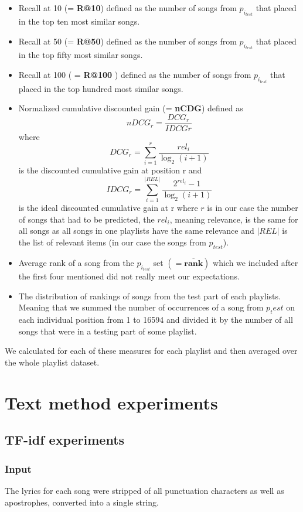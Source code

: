 \begin{itemize}
    \item Recall at 10 (= \textbf{R@10}) defined as the number of songs from $p_{i_{test}} $ that placed in the top ten most similar songs.
    \item Recall at 50 (= \textbf{R@50}) defined as the number of songs from $p_{i_{test}} $ that placed in the top fifty most similar songs.
    \item Recall at 100 ( = \textbf{R@100} ) defined as the number of songs from $p_{i_{test}} $ that placed in the top hundred most similar songs.
    \item Normalized cumulative discounted gain (= \textbf{nCDG}) defined as 
    $${nDCG_{r}} = \frac{DCG_{r}}{IDCG{r}} $$
    where 
    $${DCG_{r}} =\sum_{i=1}^{r}{\frac {rel_{i}}{\log _{2}(i+1)}} $$ 
    is the discounted cumulative gain at position r and 
    $$ {IDCG_{r}} =\sum _{i=1}^{|REL|}{\frac {2^{rel_{i}}-1}{\log _{2}(i+1)}} $$
    is the ideal discounted cumulative gain at r
    where $r$ is in our case the number of songs that had to be predicted, the $rel_i$, meaning relevance, is the same for all songs as all songs in one playlists have the same relevance and $|REL|$ is the list of relevant items (in our case the songs from $p_{test}$).
    \item Average rank of a song from the $p_{i_{test}}$ set $ \boldsymbol{ (= \overline{rank})} $ which we included after the first four mentioned did not really meet our expectations.
    \item The distribution of rankings of songs from the test part of each playlists. Meaning that we summed the number of occurrences of a song from $p_test$ on each individual position from 1 to 16594 and divided it by the number of all songs that were in a testing part of some playlist. 
    
\end{itemize}
We calculated for each of these measures for each playlist and then averaged over the whole playlist dataset. 
\section{Text method experiments}

\subsection{TF-idf experiments}\label{ssec:TF_idf}


\subsubsection{Input}
The lyrics for each song were stripped of all punctuation characters as well as apostrophes, converted into a single string. 
